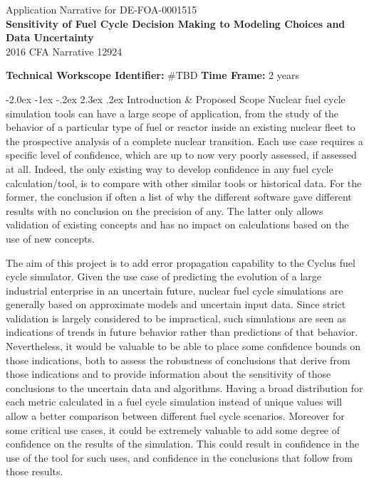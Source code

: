 \documentclass[dvips,11pt]{article}
\makeatletter
\renewcommand\section{\@startsection {section}{1}{\z@}%
                                   {-2.0ex \@plus -1ex \@minus -.2ex}%
                                   {2.3ex \@plus.2ex}%
                                   {\normalfont\bfseries}}%
\makeatother
\begin{document}
\begin{centering}
  Application Narrative for DE-FOA-0001515\\
  \textbf{\large Sensitivity of Fuel Cycle Decision Making to 
  Modeling Choices and Data Uncertainty}\\
  2016 CFA Narrative 12924\\
\end{centering}
\vspace{1em}

\noindent\textbf{Technical Workscope Identifier:} #TBD \hspace{1.5in}
\textbf{Time Frame:} 2 years

\section{Introduction \& Proposed Scope}
Nuclear fuel cycle simulation tools can have a large scope of application, from
the study of the behavior of a particular type of fuel or reactor inside an
existing nuclear fleet to the prospective analysis of a complete nuclear
transition.  Each use case requires a specific level of confidence, which are up
to now very poorly assessed, if assessed at all.  Indeed, the only existing way
to develop confidence in any fuel cycle calculation/tool, is to compare with
other similar tools or historical data.  For the former, the conclusion if often
a list of why the different software gave different results with no conclusion
on the precision of any.  The latter only allows validation of existing concepts
and has no impact on calculations based on the use of new concepts.

The aim of this project is to add error propagation capability to the Cyclus
fuel cycle simulator\cite{Cyclus_paper}. Given the use case of predicting the
evolution of a large industrial enterprise in an uncertain future, nuclear fuel
cycle simulations are generally based on approximate models and uncertain input
data.  Since strict validation is largely considered to be impractical, such
simulations are seen as indications of trends in future behavior rather than
predictions of that behavior. Nevertheless, it would be valuable to be able to
place some confidence bounds on those indications, both to assess the robustness
of conclusions that derive from those indications and to provide information
about the sensitivity of those conclusions to the uncertain data and algorithms.
Having a broad distribution for each metric calculated in a fuel cycle
simulation instead of unique values will allow a better comparison between
different fuel cycle scenarios.  Moreover for some critical use cases, it could
be extremely valuable to add some degree of confidence on the results of the
simulation.  This could result in confidence in the use of the tool for such
uses, and confidence in the conclusions that follow from those results.
\end{document}
